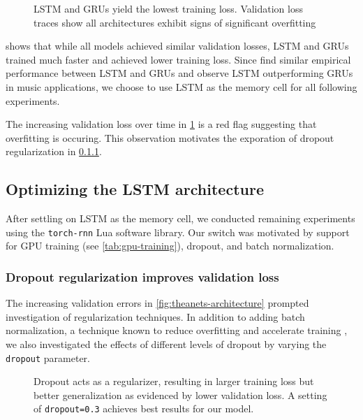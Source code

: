 \begin{figure}[tb]
    \centering
    
    \caption{LSTM and GRUs yield the lowest training loss. Validation loss
      traces show all architectures exhibit signs of significant overfitting}
    \label{fig:theanets-architecture}
\end{figure}

 shows that while all models achieved similar
validation losses, LSTM and GRUs trained much faster and achieved lower
training loss. Since \citet{zaremba2015empirical} find similar empirical
performance between LSTM and GRUs and \citet{Nayebi2015} observe LSTM
outperforming GRUs in music applications, we choose to use LSTM as the memory
cell for all following experiments.

The increasing validation loss over time in \cref{fig:theanets-architecture}
is a red flag suggesting that overfitting is occuring. This observation motivates
the exporation of dropout regularization in \cref{sec:lstm-dropout}.

\subsection{Optimizing the LSTM architecture}\label{sec:lstm-grid-search}

After settling on LSTM as the memory cell, we conducted remaining experiments
using the \texttt{torch-rnn} Lua software library. Our switch was motivated by
support for GPU training (see \vref{tab:gpu-training}), dropout, and batch normalization.

\subsubsection{Dropout regularization improves validation loss}\label{sec:lstm-dropout}

The increasing validation errors in \vref{fig:theanets-architecture} prompted
investigation of regularization techniques. In addition to adding batch
normalization, a technique known to reduce overfitting and accelerate training
\cite{ioffe2015batch}, we also investigated the effects of different levels
of dropout by varying the \texttt{dropout} parameter.

\begin{figure}[tb]
  \centering
  
  \caption{Dropout acts as a regularizer, resulting in larger training loss
  but better generalization as evidenced by lower validation loss. A setting of
\texttt{dropout=0.3} achieves best results for our model.}
  \label{fig:torch-rnn-dropout}
\end{figure}

